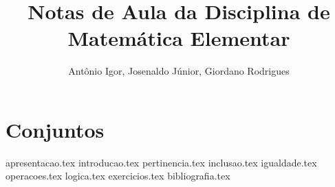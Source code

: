 \documentclass[a4paper,12pt, oneside]{book}
\begin{document}
    \nocite{*}
    \title{Notas de Aula da Disciplina de Matemática Elementar}
    \author{Antônio Igor, Josenaldo Júnior, Giordano Rodrigues} 

    \frontmatter %
    \maketitle
    \tableofcontents

    \mainmatter %

    \chapter{Conjuntos}
    {apresentacao.tex}
    {introducao.tex}
    {pertinencia.tex}
    {inclusao.tex}
    {igualdade.tex}
    {operacoes.tex}
    {logica.tex}
    {exercicios.tex}
    {bibliografia.tex} %
\end{document}
